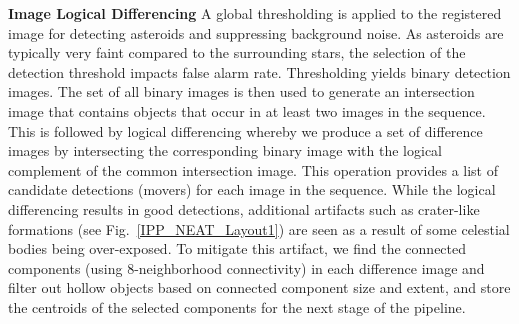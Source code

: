 \documentclass{article}
\begin{document}
{\bf Image Logical Differencing}
A global thresholding is applied to the registered image for detecting asteroids and suppressing background noise.  As asteroids are typically very faint compared to the surrounding stars, the selection of the detection threshold impacts false alarm rate.  Thresholding yields binary detection images.  The set of all binary images is then used to generate an intersection image that contains objects that occur in at least two images in the sequence.  This is followed by logical differencing whereby we produce a set of difference images by intersecting the corresponding binary image with the logical complement of the common intersection image.  This operation provides a list of candidate detections (movers) for each image in the sequence.  While the logical differencing results in good detections, additional artifacts such as crater-like formations (see Fig.~\ref{IPP_NEAT_Layout1}) are seen as a result of some celestial bodies being over-exposed. To mitigate this artifact, we find the connected components (using 8-neighborhood connectivity) in each difference image and filter out hollow objects based on connected component size and extent, and store the centroids of the selected components for the next stage of the pipeline. 
\end{document}
